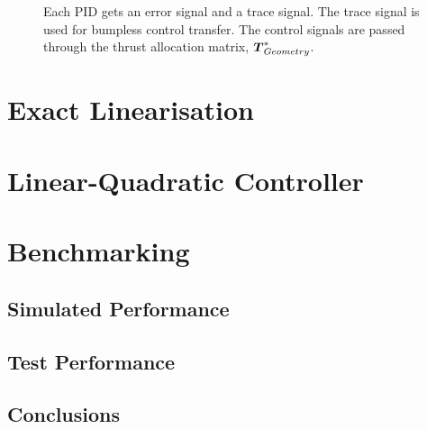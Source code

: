 \begin{figure}
    
    \caption{Each PID gets an error signal and a trace signal. The trace signal is used for bumpless control transfer. The control signals are passed through the thrust allocation matrix, $\thrusterGeometryOnes[*]$.} 
    \label{fig:dec_pid}
\end{figure}

\section{Exact Linearisation}

\section{Linear-Quadratic Controller}


\section{Benchmarking}
\subsection{Simulated Performance}
\subsection{Test Performance}
\subsection{Conclusions}